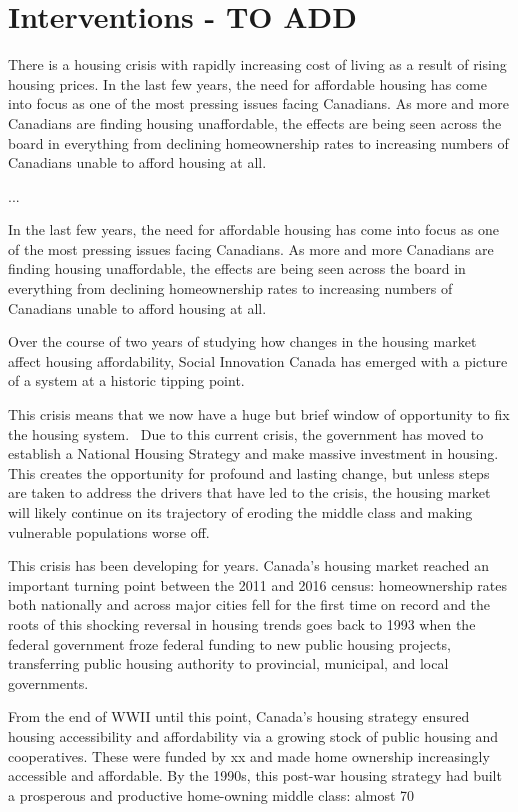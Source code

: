 \chapter{Interventions - TO ADD}

There is a housing crisis with rapidly increasing cost of living as a result of rising housing prices. 
In the last few years, the need for affordable housing has come into focus as one of the most pressing issues facing Canadians. As more and more Canadians are finding housing unaffordable, the effects are being seen across the board in everything from declining homeownership rates to increasing numbers of Canadians unable to afford housing at all.

...



In the last few years, the need for affordable housing has come into focus as one of the most pressing issues facing Canadians. As more and more Canadians are finding housing unaffordable, the effects are being seen across the board in everything from declining homeownership rates to increasing numbers of Canadians unable to afford housing at all.

Over the course of two years of studying how changes in the housing market affect housing affordability, Social Innovation Canada has emerged with a picture of a system at a historic tipping point. 

This crisis means that we now have a huge but brief window of opportunity to fix the housing system.  Due to this current crisis, the government has moved to establish a National Housing Strategy and make massive investment in housing. This creates the opportunity for profound and lasting change, but unless steps are taken to address the drivers that have led to the crisis, the housing market will likely continue on its trajectory of eroding the middle class and making vulnerable populations worse off.   

This crisis has been developing for years. Canada's housing market reached an important turning point between the 2011 and 2016 census: homeownership rates both nationally and across major cities fell for the first time on record and the roots of this shocking reversal in housing trends goes back to 1993 when the federal government froze federal funding to new public housing projects, transferring public housing authority to provincial, municipal, and local governments. 

From the end of WWII until this point, Canada’s housing strategy ensured housing accessibility and affordability via a growing stock of public housing and cooperatives. These were funded by xx and made home ownership increasingly accessible and affordable. By the 1990s, this post-war housing strategy had built a prosperous and productive home-owning middle class: almost 70%

